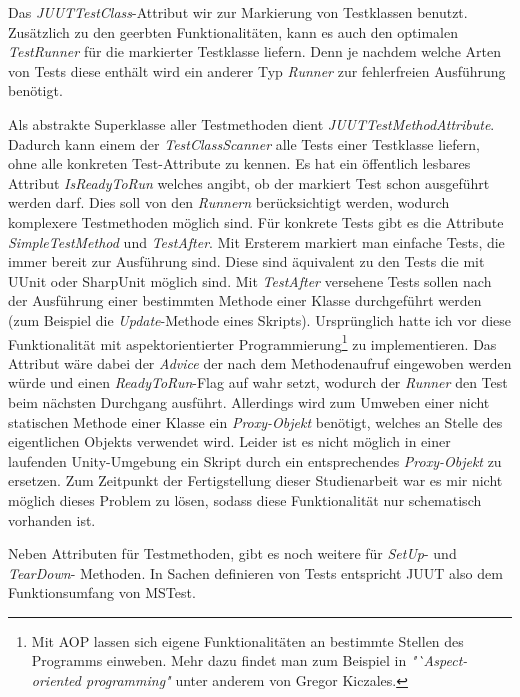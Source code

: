 Das \textit{JUUTTestClass}-Attribut wir zur Markierung von Testklassen benutzt. Zusätzlich zu den geerbten Funktionalitäten, kann es auch den optimalen \textit{TestRunner} für die markierter Testklasse liefern. Denn je nachdem welche Arten von Tests diese enthält wird ein anderer Typ \textit{Runner} zur fehlerfreien Ausführung benötigt.

Als abstrakte Superklasse aller Testmethoden dient \textit{JUUTTestMethodAttribute}. Dadurch kann einem der \textit{TestClassScanner} alle Tests einer Testklasse liefern, ohne alle konkreten Test-Attribute zu kennen. Es hat ein öffentlich lesbares Attribut \textit{IsReadyToRun} welches angibt, ob der markiert Test schon ausgeführt werden darf. Dies soll von den \textit{Runnern} berücksichtigt werden, wodurch komplexere Testmethoden möglich sind. Für konkrete Tests gibt es die Attribute \textit{SimpleTestMethod} und \textit{TestAfter}. Mit Ersterem markiert man einfache Tests, die immer bereit zur Ausführung sind. Diese sind äquivalent zu den Tests die mit UUnit oder SharpUnit möglich sind. Mit \textit{TestAfter} versehene Tests sollen nach der Ausführung einer bestimmten Methode einer Klasse durchgeführt werden (zum Beispiel die \textit{Update}-Methode eines Skripts). Ursprünglich hatte ich vor diese Funktionalität mit aspektorientierter Programmierung\footnote{Mit AOP lassen sich eigene Funktionalitäten an bestimmte Stellen des Programms einweben. Mehr dazu findet man zum Beispiel in \textit{"`Aspect-oriented programming"} unter anderem von Gregor Kiczales.} zu implementieren. Das Attribut wäre dabei der \textit{Advice} der nach dem Methodenaufruf eingewoben werden würde und einen \textit{ReadyToRun}-Flag auf wahr setzt, wodurch der \textit{Runner} den Test beim nächsten Durchgang ausführt. Allerdings wird zum Umweben einer nicht statischen Methode einer Klasse ein \textit{Proxy-Objekt} benötigt, welches an Stelle des eigentlichen Objekts verwendet wird. Leider ist es nicht möglich in einer laufenden Unity-Umgebung ein Skript durch ein entsprechendes \textit{Proxy-Objekt} zu ersetzen. Zum Zeitpunkt der Fertigstellung dieser Studienarbeit war es mir nicht möglich dieses Problem zu lösen, sodass diese Funktionalität nur schematisch vorhanden ist.

Neben Attributen für Testmethoden, gibt es noch weitere für \textit{SetUp}- und \textit{TearDown}- Methoden. In Sachen definieren von Tests entspricht JUUT also dem Funktionsumfang von MSTest.

